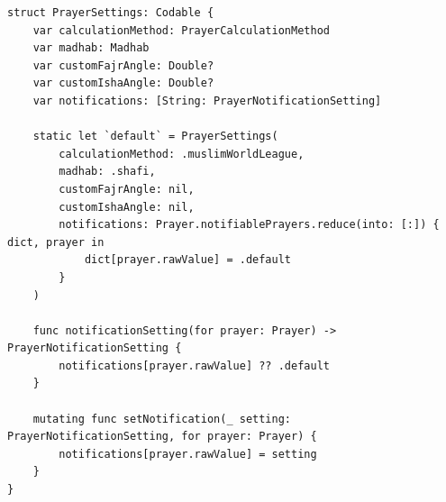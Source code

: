 \begin{lstlisting}[basicstyle=\tiny\ttfamily,breaklines=true]
struct PrayerSettings: Codable {
    var calculationMethod: PrayerCalculationMethod
    var madhab: Madhab
    var customFajrAngle: Double?
    var customIshaAngle: Double?
    var notifications: [String: PrayerNotificationSetting]
    
    static let `default` = PrayerSettings(
        calculationMethod: .muslimWorldLeague,
        madhab: .shafi,
        customFajrAngle: nil,
        customIshaAngle: nil,
        notifications: Prayer.notifiablePrayers.reduce(into: [:]) { dict, prayer in
            dict[prayer.rawValue] = .default
        }
    )
    
    func notificationSetting(for prayer: Prayer) -> PrayerNotificationSetting {
        notifications[prayer.rawValue] ?? .default
    }
    
    mutating func setNotification(_ setting: PrayerNotificationSetting, for prayer: Prayer) {
        notifications[prayer.rawValue] = setting
    }
}
\end{lstlisting}

